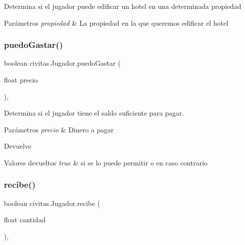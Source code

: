 Determina si el jugador puede edificar un hotel en una determinada propiedad 
\begin{DoxyParams}{Parámetros}
{\em propiedad} & La propiedad en la que queremos edificar el hotel \\
\hline
\end{DoxyParams}
\mbox{\label{classcivitas_1_1Jugador_a459494b841c3ac2c9d93b00307292d89}} 
\subsubsection{\texorpdfstring{puedo\+Gastar()}{puedoGastar()}}
{\footnotesize\ttfamily boolean civitas.\+Jugador.\+puedo\+Gastar (\begin{DoxyParamCaption}\item[{float}]{precio }\end{DoxyParamCaption})\hspace{0.3cm}{\ttfamily [inline]}, {\ttfamily [private]}}

Determina si el jugador tiene el saldo suficiente para pagar. 
\begin{DoxyParams}{Parámetros}
{\em precio} & Dinero a pagar \\
\hline
\end{DoxyParams}
\begin{DoxyReturn}{Devuelve}

\end{DoxyReturn}

\begin{DoxyRetVals}{Valores devueltos}
{\em true} & si se lo puede permitir o  en caso contrario \\
\hline
\end{DoxyRetVals}
\mbox{\label{classcivitas_1_1Jugador_aeadc08e13f894f3b86f004bfede49b8a}} 
\subsubsection{\texorpdfstring{recibe()}{recibe()}}
{\footnotesize\ttfamily boolean civitas.\+Jugador.\+recibe (\begin{DoxyParamCaption}\item[{float}]{cantidad }\end{DoxyParamCaption})\hspace{0.3cm}{\ttfamily [inline]}, {\ttfamily [package]}}

